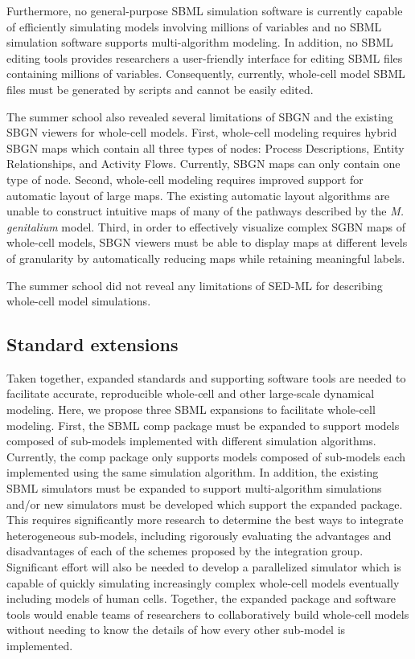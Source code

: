 \documentclass[journal,transmag]{IEEEtran}
\begin{document}
Furthermore, no general-purpose SBML simulation software is currently capable of efficiently simulating models involving millions of variables and no SBML simulation software supports multi-algorithm modeling. In addition, no SBML editing tools provides researchers a user-friendly interface for editing SBML files containing millions of variables. Consequently, currently, whole-cell model SBML files must be generated by scripts and cannot be easily edited.

The summer school also revealed several limitations of SBGN and the existing SBGN viewers for whole-cell models. First, whole-cell modeling requires hybrid SBGN maps which contain all three types of nodes: Process Descriptions, Entity Relationships, and Activity Flows. Currently, SBGN maps can only contain one type of node. Second, whole-cell modeling requires improved support for automatic layout of large maps. The existing automatic layout algorithms are unable to construct intuitive maps of many of the pathways described by the \textit{M. genitalium} model. Third, in order to effectively visualize complex SGBN maps of whole-cell models, SBGN viewers must be able to display maps at different levels of granularity by automatically reducing maps while retaining meaningful labels.

The summer school did not reveal any limitations of SED-ML for describing whole-cell model simulations.

\subsection{Standard extensions}
Taken together, expanded standards and supporting software tools are needed to facilitate accurate, reproducible whole-cell and other large-scale dynamical modeling. Here, we propose three SBML expansions to facilitate whole-cell modeling. First, the SBML comp package must be expanded to support models composed of sub-models implemented with different simulation algorithms. Currently, the comp package only supports models composed of sub-models each implemented using the same simulation algorithm. In addition, the existing SBML simulators must be expanded to support multi-algorithm simulations and/or new simulators must be developed which support the expanded package. This requires significantly more research to determine the best ways to integrate heterogeneous sub-models, including rigorously evaluating the advantages and disadvantages of each of the schemes proposed by the integration group. Significant effort will also be needed to develop a parallelized simulator which is capable of quickly simulating increasingly complex whole-cell models eventually including models of human cells. Together, the expanded package and software tools would enable teams of researchers to collaboratively build whole-cell models without needing to know the details of how every other sub-model is implemented.
\end{document}
